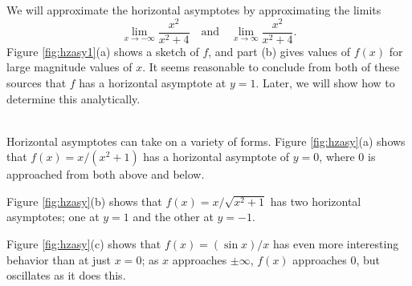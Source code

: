{}
{We will approximate the horizontal asymptotes by approximating the limits 
\[
\lim_{x\to-\infty} \frac{x^2}{x^2+4}\quad \text{and}\quad \lim_{x\to\infty} \frac{x^2}{x^2+4}.
\]
Figure \ref{fig:hzasy1}(a) shows a sketch of $f$, and part (b) gives values of $f(x)$ for large magnitude values of $x$. It seems reasonable to conclude from both of these sources that $f$ has a horizontal asymptote at $y=1$. Later, we will show how to determine this analytically.

}\\

Horizontal asymptotes can take on a variety of forms. Figure \ref{fig:hzasy}(a) shows that $f(x) = x/(x^2+1)$ has a horizontal asymptote of $y=0$, where 0 is approached from both above and below.


Figure \ref{fig:hzasy}(b) shows that $f(x) =x/\sqrt{x^2+1}$ has two horizontal asymptotes; one at $y=1$ and the other at $y=-1$.


Figure \ref{fig:hzasy}(c) shows that $f(x) = (\sin x)/x$ has even more interesting behavior than at just $x=0$; as $x$ approaches $\pm\infty$, $f(x)$ approaches 0, but oscillates as it does this.\\%

